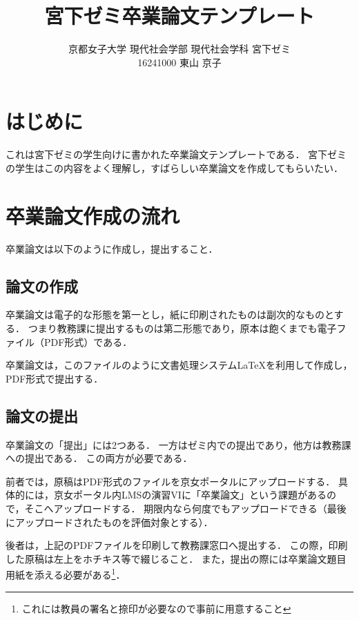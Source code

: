 \documentclass[a4paper,twocolumn,10pt]{ltjsarticle}
\title{宮下ゼミ卒業論文テンプレート}
\author{京都女子大学 現代社会学部 現代社会学科 宮下ゼミ\\
16241000 東山 京子}
\begin{document}
\maketitle

\section{はじめに}

これは宮下ゼミの学生向けに書かれた卒業論文テンプレートである．
宮下ゼミの学生はこの内容をよく理解し，すばらしい卒業論文を作成してもらいたい．

\section{卒業論文作成の流れ}

卒業論文は以下のように作成し，提出すること．

\subsection{論文の作成}

卒業論文は電子的な形態を第一とし，紙に印刷されたものは副次的なものとする．
つまり教務課に提出するものは第二形態であり，原本は飽くまでも電子ファイル（PDF形式）である．

卒業論文は，このファイルのように文書処理システム\LaTeX{}を利用して作成し，PDF形式で提出する．

\subsection{論文の提出}

卒業論文の「提出」には2つある．
一方はゼミ内での提出であり，他方は教務課への提出である．
この両方が必要である．

前者では，原稿はPDF形式のファイルを京女ポータルにアップロードする．
具体的には，京女ポータル内LMSの演習VIに「卒業論文」という課題があるので，そこへアップロードする．
期限内なら何度でもアップロードできる（最後にアップロードされたものを評価対象とする）．

後者は，上記のPDFファイルを印刷して教務課窓口へ提出する．
この際，印刷した原稿は左上をホチキス等で綴じること．
また，提出の際には卒業論文題目用紙を添える必要がある\footnote{これには教員の署名と捺印が必要なので事前に用意すること}．
\end{document}
